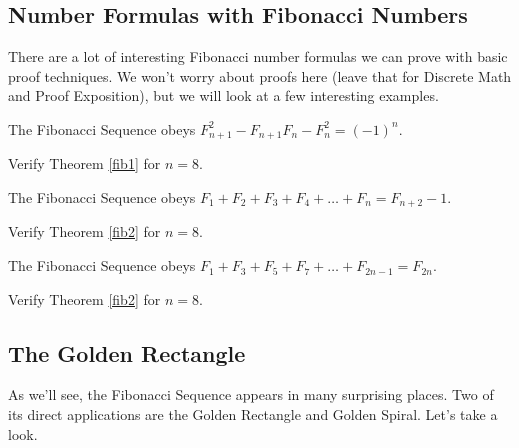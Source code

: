 \subsection{Number Formulas with Fibonacci Numbers}

There are a lot of interesting Fibonacci number formulas we can prove with basic proof techniques. We won't worry about proofs here (leave that for Discrete Math and Proof Exposition), but we will look at a few interesting examples.

\begin{theorem}\label{fib1}
The Fibonacci Sequence obeys $F_{n+1}^2 - F_{n+1}F_n- F_n^2 = (-1)^n$.
\end{theorem}

\begin{exercise}
Verify Theorem \ref{fib1} for $n = 8$.
\end{exercise}

\vspace{2in}

\begin{theorem}\label{fib2}
The Fibonacci Sequence obeys $F_1 + F_2 + F_3 + F_4 + \ldots + F_n = F_{n+2} - 1$.
\end{theorem}

\begin{exercise}
Verify Theorem \ref{fib2} for $n = 8$.
\end{exercise}

\vspace{2in}

\begin{theorem}\label{fib3}
The Fibonacci Sequence obeys $F_1 + F_3 + F_5 + F_7  + \ldots + F_{2n-1} = F_{2n}$.
\end{theorem}

\begin{exercise}
Verify Theorem \ref{fib2} for $n = 8$.
\end{exercise}

\vspace{2in}

\subsection{The Golden Rectangle}

\vspace{-.1in}

\noindent As we'll see, the Fibonacci Sequence appears in many surprising places. Two of its direct applications are the Golden Rectangle and Golden Spiral. Let's take a look.

